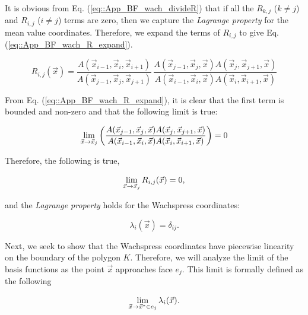 \noindent It is obvious from Eq. (\ref{eq::App_BF_wach_divideR}) that if all the $R_{k,j}$ ($k \neq j$) and $R_{i,j}$ ($i \neq j$) terms are zero, then we capture the {\em Lagrange property} for the mean value coordinates. Therefore, we expand the terms of $R_{i,j}$ to give Eq. (\ref{eq::App_BF_wach_R_expand}).

\begin{equation}
\label{eq::App_BF_wach_R_expand}
R_{i,j}(\vec{x}) = \frac{A(\vec{x}_{i-1}, \vec{x}_{i}, \vec{x}_{i+1})}{A(\vec{x}_{j-1}, \vec{x}_{j}, \vec{x}_{j+1})} \, \frac{A(\vec{x}_{j-1}, \vec{x}_{j}, \vec{x}) A(\vec{x}_{j}, \vec{x}_{j+1}, \vec{x})}{A(\vec{x}_{i-1}, \vec{x}_{i}, \vec{x}) A(\vec{x}_{i}, \vec{x}_{i+1}, \vec{x})}
\end{equation}

\noindent From Eq. (\ref{eq::App_BF_wach_R_expand}), it is clear that the first term is bounded and non-zero and that the following limit is true:

\begin{equation}
\label{eq::App_BF_wach_vertlim}
\lim\displaylimits_{\vec{x}\rightarrow \vec{x}_j} \left(  \frac{A(\vec{x}_{j-1}, \vec{x}_{j}, \vec{x}) A(\vec{x}_{j}, \vec{x}_{j+1}, \vec{x})}{A(\vec{x}_{i-1}, \vec{x}_{i}, \vec{x}) A(\vec{x}_{i}, \vec{x}_{i+1}, \vec{x})} \right) = 0
\end{equation}

\noindent Therefore, the following is true,

\begin{equation}
\label{eq::App_BF_wach_Rlim}
\lim\displaylimits_{\vec{x} \rightarrow \vec{x}_j} R_{i,j}(\vec{x}) = 0 ,
\end{equation} 

\noindent and the {\em Lagrange property} holds for the Wachspress coordinates:

\begin{equation}
\label{eq::App_BF_wach_vertFINAL}
\lambda_i (\vec{x}) = \delta_{ij}.
\end{equation} 

Next, we seek to show that the Wachspress coordinates have piecewise linearity on the boundary of the polygon $K$. Therefore, we will analyze the limit of the basis functions as the point $\vec{x}$ approaches face $e_j$. This limit is formally defined as the following

\begin{equation}
\label{eq::App_BF_wach_edge_lim_init}
\lim\displaylimits_{\vec{x} \rightarrow \vec{x}^* \in e_j}  \lambda_i (\vec{x}) .
\end{equation} 

